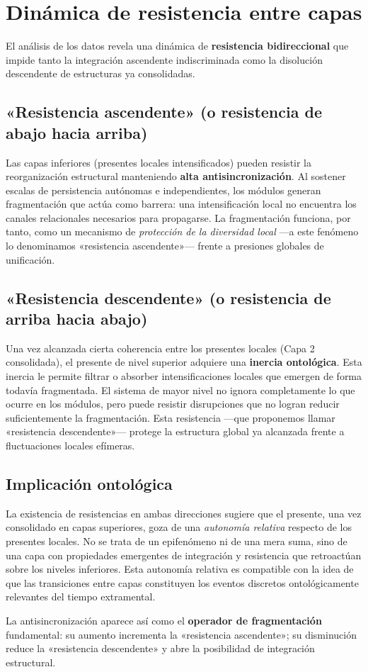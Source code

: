 \section{Dinámica de resistencia entre capas}

El análisis de los datos revela una dinámica de \textbf{resistencia bidireccional} que impide tanto la integración ascendente indiscriminada como la disolución descendente de estructuras ya consolidadas.

\subsection{«Resistencia ascendente» (o resistencia de abajo hacia arriba)}

Las capas inferiores (presentes locales intensificados) pueden resistir la reorganización estructural manteniendo \textbf{alta antisincronización}. Al sostener escalas de persistencia autónomas e independientes, los módulos generan fragmentación que actúa como barrera: una intensificación local no encuentra los canales relacionales necesarios para propagarse. La fragmentación funciona, por tanto, como un mecanismo de \textit{protección de la diversidad local} —a este fenómeno lo denominamos «resistencia ascendente»— frente a presiones globales de unificación.

\subsection{«Resistencia descendente» (o resistencia de arriba hacia abajo)}

Una vez alcanzada cierta coherencia entre los presentes locales (Capa 2 consolidada), el presente de nivel superior adquiere una \textbf{inercia ontológica}. Esta inercia le permite filtrar o absorber intensificaciones locales que emergen de forma todavía fragmentada. El sistema de mayor nivel no ignora completamente lo que ocurre en los módulos, pero puede resistir disrupciones que no logran reducir suficientemente la fragmentación. Esta resistencia —que proponemos llamar «resistencia descendente»— protege la estructura global ya alcanzada frente a fluctuaciones locales efímeras.

\subsection{Implicación ontológica}

La existencia de resistencias en ambas direcciones sugiere que el presente, una vez consolidado en capas superiores, goza de una \textit{autonomía relativa} respecto de los presentes locales. No se trata de un epifenómeno ni de una mera suma, sino de una capa con propiedades emergentes de integración y resistencia que retroactúan sobre los niveles inferiores. Esta autonomía relativa es compatible con la idea de que las transiciones entre capas constituyen los eventos discretos ontológicamente relevantes del tiempo extramental.

La antisincronización aparece así como el \textbf{operador de fragmentación} fundamental: su aumento incrementa la «resistencia ascendente»; su disminución reduce la «resistencia descendente» y abre la posibilidad de integración estructural.